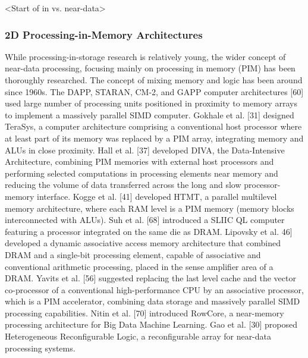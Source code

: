 \documentclass{superfri}
\begin{document}
<Start of in vs. near-data>

\subsubsection{2D Processing-in-Memory Architectures}
\label{sec:2D_PiM}
While processing-in-storage research is relatively young, the wider concept of near-data processing, focusing mainly on processing in memory (PIM) has been thoroughly researched. The concept of mixing memory and logic has been around since 1960s. The DAPP, STARAN, CM-2, and GAPP computer architectures [60] used large number of processing units positioned in proximity to memory arrays to implement a massively parallel SIMD computer. Gokhale et al. [31] designed TeraSys, a computer architecture comprising a conventional host processor where at least part of its memory was replaced by a PIM array, integrating memory and ALUs in close proximity. Hall et al. [37] developed DIVA, the Data-Intensive Architecture, combining PIM memories with external host processors and performing selected computations in processing elements near memory and reducing the volume of data transferred across the long and slow processor-memory interface. Kogge et al. [41] developed HTMT, a parallel multilevel memory architecture, where each RAM level is a PIM memory (memory blocks interconnected with ALUs). Suh et al. [68]  introduced a SLIIC QL computer featuring a processor integrated on the same die as DRAM. Lipovsky et al. 46] developed a dynamic associative access memory architecture that combined DRAM and a single-bit processing element, capable of associative and conventional arithmetic processing, placed in the sense amplifier area of a DRAM. Yavits et al. [56] suggested replacing the last level cache and the vector co-processor of a conventional high-performance CPU by an associative processor, which is a PIM accelerator, combining data storage and massively parallel SIMD processing capabilities. Nitin et al. [70] introduced RowCore, a near-memory processing architecture for Big Data Machine Learning. Gao et al. [30] proposed Heterogeneous Reconfigurable Logic, a reconfigurable array for near-data processing systems.

\end{document}
